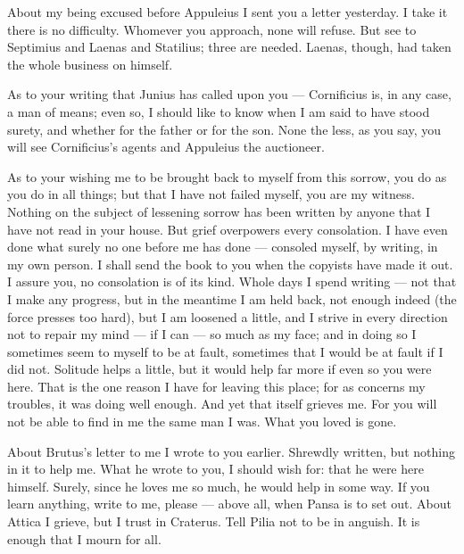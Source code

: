 

 About my being excused before Appuleius I sent you a letter yesterday. I take it there is no difficulty. Whomever you approach, none will refuse. But see to Septimius and Laenas and Statilius; three are needed. Laenas, though, had taken the whole business on himself.

 As to your writing that Junius has called upon you --- Cornificius is, in any case, a man of means; even so, I should like to know when I am said to have stood surety, and whether for the father or for the son. None the less, as you say, you will see Cornificius's agents and Appuleius the auctioneer.

 As to your wishing me to be brought back to myself from this sorrow, you do as you do in all things; but that I have not failed myself, you are my witness. Nothing on the subject of lessening sorrow has been written by anyone that I have not read in your house. But grief overpowers every consolation. I have even done what surely no one before me has done --- consoled myself, by writing, in my own person. I shall send the book to you when the copyists have made it out. I assure you, no consolation is of its kind. Whole days I spend writing --- not that I make any progress, but in the meantime I am held back, not enough indeed (the force presses too hard), but I am loosened a little, and I strive in every direction not to repair my mind --- if I can --- so much as my face; and in doing so I sometimes seem to myself to be at fault, sometimes that I would be at fault if I did not. Solitude helps a little, but it would help far more if even so you were here. That is the one reason I have for leaving this place; for as concerns my troubles, it was doing well enough. And yet that itself grieves me. For you will not be able to find in me the same man I was. What you loved is gone.

 About Brutus's letter to me I wrote to you earlier. Shrewdly written, but nothing in it to help me. What he wrote to you, I should wish for: that he were here himself. Surely, since he loves me so much, he would help in some way. If you learn anything, write to me, please --- above all, when Pansa is to set out. About Attica I grieve, but I trust in Craterus. Tell Pilia not to be in anguish. It is enough that I mourn for all.
